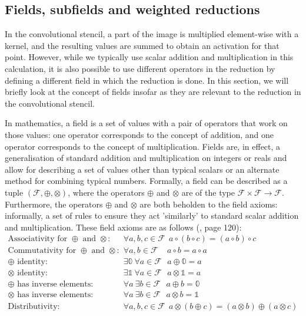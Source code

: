 \documentclass[11pt]{article} %
\begin{document}
\subsection{Fields, subfields and weighted reductions}
In the convolutional stencil, a part of the image is multiplied element-wise with a kernel, and the resulting values are summed to obtain an activation for that point. However, while we typically use scalar addition and multiplication in this calculation, it is also possible to use different operators in the reduction by defining a different field in which the reduction is done. In this section, we will briefly look at the concept of fields insofar as they are relevant to the reduction in the convolutional stencil.

In mathematics, a field is a set of values with a pair of operators that work on those values: one operator corresponds to the concept of addition, and one operator corresponds to the concept of multiplication. Fields are, in effect, a generalisation of standard addition and multiplication on integers or reals and allow for describing a set of values other than typical scalars or an alternate method for combining typical numbers. Formally, a field can be described as a tuple $(\mathcal{F}, \oplus, \otimes)$, where the operators $\oplus$ and $\otimes$ are of the type $\mathcal{F}\times\mathcal{F}\rightarrow\mathcal{F}$. Furthermore, the operators $\oplus$ and $\otimes$ are both beholden to the field axioms: informally, a set of rules to ensure they act 'similarly' to standard scalar addition and multiplication. These field axioms are as follows (, page 120):
\begin{align}
\textrm{Associativity for $\oplus$ and $\otimes$: }&\forall a,b,c\in \mathcal{F}~~  a \circ (b \circ c) = (a\circ b) \circ c \\ 
\textrm{Commutativity for $\oplus$ and $\otimes$: }&\forall a,b\in \mathcal{F}~~~~~ a\circ b = a  \circ a \\
\oplus\textrm{ identity: }& \exists \mathbb{0}~\forall a\in \mathcal{F}~~~ a\oplus \mathbb{0} = a \\ 
\otimes\textrm{ identity: }& \exists \mathbb{1}~\forall a\in \mathcal{F}~~~ a\otimes \mathbb{1} = a \\ 
\oplus\textrm{ has inverse elements: }& \forall a~\exists b\in \mathcal{F}~~~ a\oplus b = \mathbb{0}  \\ 
\otimes\textrm{ has inverse elements: }& \forall a~\exists b\in \mathcal{F}~~~ a\otimes b = \mathbb{1}  \\ 
\textrm{Distributivity: }&\forall a,b,c\in \mathcal{F}~~ a\otimes (b \oplus c) = (a\otimes b)\oplus(a\otimes c)
\end{align}
\end{document}
